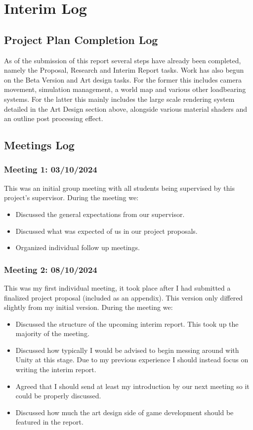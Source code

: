 \documentclass{report}
\begin{document}
\chapter{Interim Log}

\section{Project Plan Completion Log}

As of the submission of this report several steps have already been completed, namely the Proposal, Research and Interim Report tasks. Work has also begun on the Beta Version and Art design tasks. For the former this includes camera movement, simulation management, a world map and various other loadbearing systems. For the latter this mainly includes the large scale rendering system detailed in the Art Design section above, alongside various material shaders and an outline post processing effect.

\section{Meetings Log}

\subsection{Meeting 1: 03/10/2024}

This was an initial group meeting with all students being supervised by this project's supervisor. During the meeting we:
\begin{itemize}
  \item Discussed the general expectations from our supervisor. 
  \item Discussed what was expected of us in our project proposals. 
  \item Organized individual follow up meetings. 
\end{itemize}

\subsection{Meeting 2: 08/10/2024}

This was my first individual meeting, it took place after I had submitted a finalized project proposal (included as an appendix). This version only differed slightly from my initial version. During the meeting we:
\begin{itemize}
  \item Discussed the structure of the upcoming interim report. This took up the majority of the meeting.
  \item Discussed how typically I would be advised to begin messing around with Unity at this stage. Due to my previous experience I should instead focus on writing the interim report. 
  \item Agreed that I should send at least my introduction by our next meeting so it could be properly discussed.
  \item Discussed how much the art design side of game development should be featured in the report.
\end{itemize}
\end{document}
